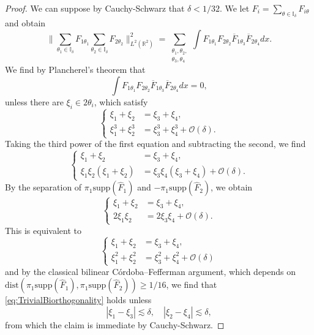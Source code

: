 \documentclass{amsart}
\theoremstyle{definition}
\newcommand{\R}{\mathbb{R}}
\begin{document}
\begin{proof}
We can suppose by Cauchy-Schwarz that $\delta < 1/32$.
We let $F_i = \sum_{\theta \in \mathbb{I}_{\delta}} F_{i \theta}$ and obtain
\begin{equation*}
\big\| \sum_{\theta_1 \in \mathbb{I}_{\delta}} F_{1 \theta_1} \sum_{\theta_2 \in \mathbb{I}_{\delta}} F_{2 \theta_2} \big\|^2_{L^2(\R^2)} = \sum_{\substack{\theta_1,\theta_2, \\ \theta_3,\theta_4}} \int F_{1 \theta_1} F_{2 \theta_2} \overline{F}_{1 \theta_3} \overline{F}_{2 \theta_4} dx.
\end{equation*}
We find by Plancherel's theorem that
\begin{equation}
\label{eq:TrivialBiorthogonality}
\int F_{1 \theta_1} F_{2 \theta_2} \overline{F}_{1 \theta_3} \overline{F}_{2 \theta_4} dx = 0,
\end{equation}
unless there are $\xi_i \in 2 \theta_i$, which satisfy
\begin{equation*}
\left\{ \begin{array}{cl}
\xi_1 + \xi_2 &= \xi_3 + \xi_4, \\
\xi_1^3 + \xi_2^3 &= \xi_3^3 + \xi_4^3 + \mathcal{O}(\delta).
\end{array} \right.
\end{equation*}
Taking the third power of the first equation and subtracting the second, we find
\begin{equation*}
\left\{ \begin{array}{cl}
\xi_1 + \xi_2 &= \xi_3 + \xi_4, \\
\xi_1 \xi_2 (\xi_1+\xi_2) &= \xi_3 \xi_4(\xi_3 + \xi_4) + \mathcal{O}(\delta).
\end{array} \right.
\end{equation*}
By the separation of $\pi_1 \text{supp}(\hat{F}_1)$ and $-\pi_1 \text{supp}(\hat{F}_2)$, we obtain
\begin{equation*}
\left\{ \begin{array}{cl}
\xi_1 + \xi_2 &= \xi_3 + \xi_4, \\
2 \xi_1 \xi_2  &=  2 \xi_3 \xi_4 + \mathcal{O}(\delta).
\end{array} \right.
\end{equation*}
This is equivalent to
\begin{equation}
\label{eq:BiorthogonalityAux}
\left\{ \begin{array}{cl}
\xi_1 + \xi_2 &= \xi_3 + \xi_4, \\
\xi_1^2 + \xi_2^2  &=  \xi_3^2 + \xi_4^2 + \mathcal{O}(\delta)
\end{array} \right.
\end{equation}
and by the classical bilinear C\'ordoba--Fefferman argument, which depends on \\ $\text{dist}(\pi_1 \text{supp}(\hat{F}_1),\pi_1 \text{supp}(\hat{F}_2)) \geq 1/16$, we find that \eqref{eq:TrivialBiorthogonality} holds unless
\begin{equation}
\label{eq:Biorthogonality}
|\xi_1 - \xi_3| \lesssim \delta, \quad |\xi_2 - \xi_4 | \lesssim \delta,
\end{equation}
from which the claim is immediate by Cauchy-Schwarz. 


\end{proof}
\end{document}
